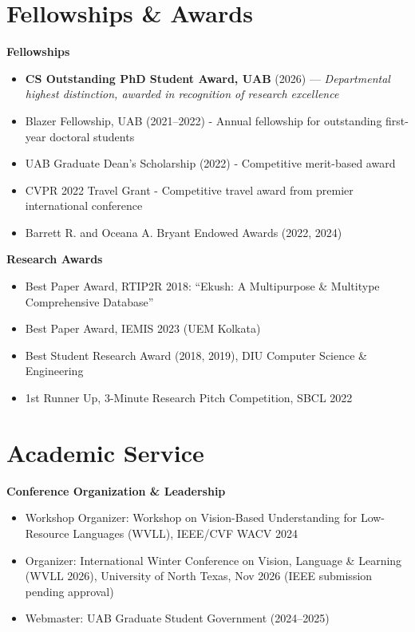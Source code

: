 \documentclass[11pt]{article}
\begin{document}
\section{Fellowships \& Awards}
\textbf{Fellowships}
\begin{itemize}
  \item \textbf{CS Outstanding PhD Student Award, UAB} (2026) --- \textit{Departmental highest distinction, awarded in recognition of research excellence}
  \item Blazer Fellowship, UAB (2021--2022) - Annual fellowship for outstanding first-year doctoral students
  \item UAB Graduate Dean's Scholarship (2022) - Competitive merit-based award
  \item CVPR 2022 Travel Grant - Competitive travel award from premier international conference
  \item Barrett R. and Oceana A. Bryant Endowed Awards (2022, 2024)
\end{itemize}

\textbf{Research Awards}
\begin{itemize}
  \item Best Paper Award, RTIP2R 2018: ``Ekush: A Multipurpose \& Multitype Comprehensive Database''
  \item Best Paper Award, IEMIS 2023 (UEM Kolkata)
  \item Best Student Research Award (2018, 2019), DIU Computer Science \& Engineering
  \item 1st Runner Up, 3-Minute Research Pitch Competition, SBCL 2022
\end{itemize}

\section{Academic Service}
\textbf{Conference Organization \& Leadership}
\begin{itemize}
  \item Workshop Organizer: Workshop on Vision-Based Understanding for Low-Resource Languages (WVLL), IEEE/CVF WACV 2024
\item Organizer: International Winter Conference on Vision, Language \& Learning (WVLL 2026), University of North Texas, Nov 2026 (IEEE submission pending approval)
  \item Webmaster: UAB Graduate Student Government (2024--2025)
\end{itemize}
\end{document}
